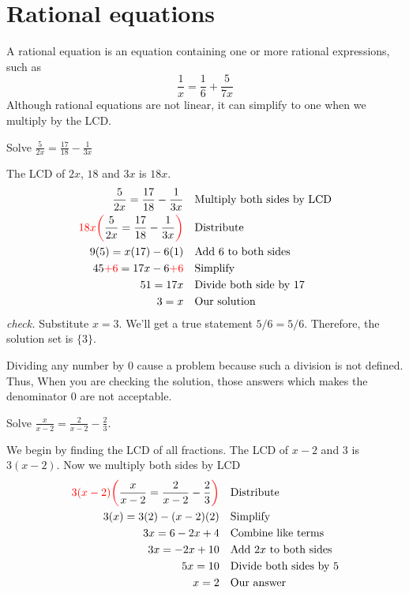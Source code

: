 \section{Rational equations}
A rational equation is an equation containing one or more rational expressions, such as 
\begin{equation*}
    \frac{1}{x}=\frac{1}{6}+\frac{5}{7x}
\end{equation*}
Although rational equations are not linear, it can simplify to one when we multiply by the LCD.
\begin{exa}
    Solve $\displaystyle \frac{5}{2x}=\frac{17}{18}-\frac{1}{3x}$
\end{exa}
The LCD of $2x$, $18$ and $3x$ is $18x$.
\begin{align*}
    \frac{5}{2x}=\frac{17}{18}-\frac{1}{3x}&    &&\text{Multiply both sides by LCD}\\
    \textcolor{red}{18x\biggl(}\frac{5}{2x}=\frac{17}{18}-\frac{1}{3x}\textcolor{red}{\biggr)}& &&\text{Distribute}\\
    9(5) = x(17)-6(1)&  &&\text{Add 6 to both sides}\\
    45\textcolor{red}{+6} = 17x-6\textcolor{red}{+6}&   &&\text{Simplify}\\
    51 =17x& &  &\text{Divide both side by 17}\\
    3 = x& &&\text{Our solution}
\end{align*}
\textit{check.} Substitute $x=3$. We'll get a true statement $5/6=5/6$. Therefore, the solution set is $\{3\}$.
\begin{nt}
    Dividing any number by $0$ cause a problem because such a division is not defined. Thus, When you are checking the solution, those answers which makes the denominator $0$ are not acceptable.
\end{nt}
\begin{exa}
    Solve $\displaystyle \frac{x}{x-2}=\frac{2}{x-2}-\frac{2}{3}$.
\end{exa}
We begin by finding the LCD of all fractions. The LCD of $x-2$ and $3$ is $3(x-2)$. Now we multiply both sides by LCD
\begin{align*}
    \textcolor{red}{3(x-2)\biggl(}\frac{x}{x-2}=\frac{2}{x-2}-\frac{2}{3}\textcolor{red}{\biggr)}&   
    &&\text{Distribute}\\
    3(x) = 3(2) - (x-2)(2)& &&\text{Simplify}\\
    3x = 6 - 2x+4&  &&\text{Combine like terms}\\
    3x = -2x+10&    &&\text{Add $2x$ to both sides}\\
    5x =10& &&\text{Divide both sides by 5}\\
    x = 2&  &&\text{Our answer}
\end{align*}
